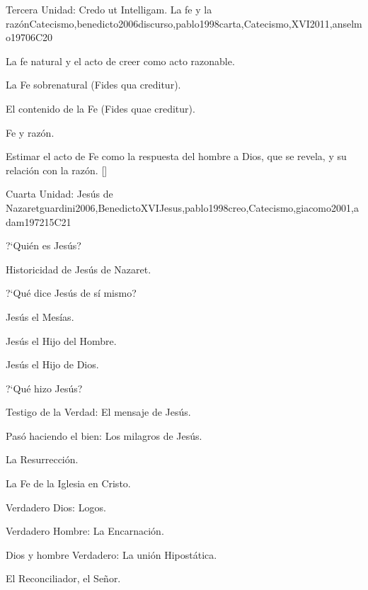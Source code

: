 \begin{syllabus}
\begin{unit}{}{Tercera Unidad: Credo ut Intelligam. La fe y la razón}{Catecismo,benedicto2006discurso,pablo1998carta,Catecismo,XVI2011,anselmo1970}{6}{C20}
\begin{topics}
	\item La fe natural y el acto de creer como acto razonable.
	\item La Fe sobrenatural (Fides qua creditur).
	\item El contenido de la Fe (Fides quae creditur).
	\item Fe y razón.
\end{topics}
\begin{learningoutcomes}
	\item Estimar el acto de Fe como la respuesta del hombre a Dios, que se revela, y su relación con la razón. [\Familiarity]
\end{learningoutcomes}
\end{unit}

\begin{unit}{}{Cuarta Unidad: Jesús de Nazaret}{guardini2006,BenedictoXVIJesus,pablo1998creo,Catecismo,giacomo2001,adam1972}{15}{C21}
\begin{topics}
	\item ?`Quién es Jesús?
	    \begin{subtopics}
		  \item Historicidad de Jesús de Nazaret.
	    \end{subtopics}
	\item ?`Qué dice Jesús de sí mismo?
	    \begin{subtopics}
		\item Jesús el Mesías.
		\item Jesús el Hijo del Hombre.
		\item Jesús el Hijo de Dios.
	    \end{subtopics}
	\item ?`Qué hizo Jesús?
	    \begin{subtopics}
		\item Testigo de la Verdad: El mensaje de Jesús.
		\item Pasó haciendo el bien: Los milagros de Jesús.
		\item La Resurrección.
	    \end{subtopics}
	\item La Fe de la Iglesia en Cristo.
	    \begin{subtopics}
		\item Verdadero Dios: Logos.
		\item Verdadero Hombre: La Encarnación.
		\item Dios y hombre Verdadero: La unión Hipostática.
		\item El Reconciliador, el Señor.
	    \end{subtopics}


\end{topics}
\end{unit}
\end{syllabus}
